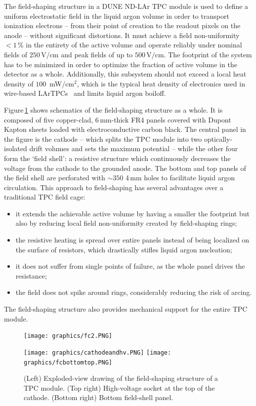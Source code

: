 The field-shaping structure in a DUNE ND-LAr TPC module is used to define a uniform electrostatic field in the liquid argon volume in order to transport ionization electrons -- from their point of creation to the readout pixels on the anode -- without significant distortions. It must achieve a field non-uniformity $<1\,\%$ in the entirety of the active volume and operate reliably under nominal fields of $250\,$V$/$cm and peak fields of up to $500\,$V$/$cm. The footprint of the system has to be minimized in order to optimize the fraction of active volume in the detector as a whole. Additionally, this subsystem should not exceed a local heat density of $100\,$ mW/cm$^2$, which is the typical heat density of electronics used in wire-based LArTPCs~\cite{notsure} and limits liquid argon boiloff.

Figure\,\ref{fig:field_shell} shows schematics of the field-shaping structure as a whole. It is composed of five copper-clad, 6\,mm-thick FR4 panels covered with Dupont Kapton sheets loaded with electroconductive carbon black. The central panel in the figure is the cathode -- which splits the TPC module into two optically-isolated drift volumes and sets the maximum potential -- while the other four form the `field shell': a resistive structure which continuously decreases the voltage from the cathode to the grounded anode. The bottom and top panels of the field shell are perforated with $\sim350$ 4\,mm holes to facilitate liquid argon circulation. This approach to field-shaping has several advantages over a traditional TPC field cage:
\begin{itemize}
  \item it extends the achievable active volume by having a smaller the footprint but also by reducing local field non-uniformity created by field-shaping rings;
  \item the resistive heating is spread over entire panels instead of being localized on the surface of resistors, which drastically stifles liquid argon nucleation;
  \item it does not suffer from single points of failure, as the whole panel drives the resistance;
  \item the field does not spike around rings, considerably reducing the risk of arcing.
\end{itemize}
The field-shaping structure also provides mechanical support for the entire TPC module.

\begin{figure}[htbp]
\centering
\begin{minipage}[b]{.4\textwidth}
\texttt{[image: graphics/fc2.PNG]}
\end{minipage}
\qquad
\begin{minipage}[b]{.4\textwidth}
\texttt{[image: graphics/cathodeandhv.PNG]}
\texttt{[image: graphics/fcbottomtop.PNG]}
\end{minipage}
\caption{(Left) Exploded-view drawing of the field-shaping structure of a TPC module. (Top right) High-voltage socket at the top of the cathode. (Bottom right) Bottom field-shell panel.}
\label{fig:field_shell}
\end{figure}


